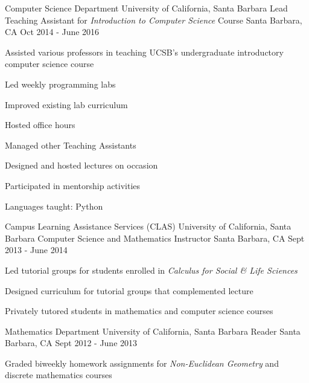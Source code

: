 \begin{cventries}
  \cventry
{Computer Science Department \newline University of California, Santa Barbara}
    {Lead Teaching Assistant for \emph{Introduction to Computer Science} Course}
    {Santa Barbara, CA}
    {Oct 2014 - June 2016}
    {
      \begin{cvitems}
	\item {Assisted various professors in teaching UCSB's undergraduate introductory computer science course}\\
	 \begin{cvitems}
        \item {Led weekly programming labs}
        \item Improved existing lab curriculum
        \item {Hosted office hours}
        \item {Managed other Teaching Assistants}
	\item {Designed and hosted lectures on occasion}
	\end{cvitems}
	\vspace{2mm}
	\item Participated in mentorship activities
	\item Languages taught: Python
      \end{cvitems}
    }

  \cventry
{Campus Learning Assistance Services (CLAS) \newline University of California, Santa Barbara}
    {Computer Science and Mathematics Instructor}
    {Santa Barbara, CA}
    {Sept 2013 - June 2014}
    {
      \begin{cvitems}
	\item {Led tutorial groups for students enrolled in \emph{Calculus for Social \& Life Sciences}}
	\item {Designed curriculum for tutorial groups that complemented lecture}
        \item {Privately tutored students in mathematics and computer science courses}
      \end{cvitems}
    }

  \cventry
{Mathematics Department \newline University of California, Santa Barbara}
    {Reader}
    {Santa Barbara, CA}
    {Sept 2012 - June 2013}
    {
      \begin{cvitems}
	\item {Graded biweekly homework assignments for \emph{Non-Euclidean Geometry} and discrete mathematics courses}
      \end{cvitems}
    }



  \end{cventries}
